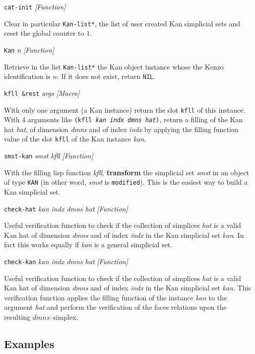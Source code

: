 {\parindent=0mm
{\leftskip=5mm
{\tt cat-init} \hfill {\em [Function]} \par}
{\leftskip=15mm
Clear in particular {\tt *Kan-list*}, the list of user created Kan simplicial sets  and reset
the global counter to $1$. \par}
{\leftskip=5mm 
{\tt Kan} {\em n} \hfill {\em [Function]}\par}
{\leftskip=15mm 
Retrieve in the list {\tt *Kan-list*} the Kan object instance whose the Kenzo identification  is $n$.
If it does not exist, return {\tt NIL}. \par}
{\leftskip=5mm 
{\tt kfll \&rest} {\em args} \hfill {\em [Macro]}\par}
{\leftskip=15mm 
With only one argument (a Kan instance) return the slot {\tt kfll} of this instance. With $4$ arguments
like {\tt (kfll {\em kan indx dmns hat})}, return a filling of the Kan hat {\em hat}, of dimension {\em dmns}
and of index {\em indx} by applying the filling function value of the slot {\tt kfll} of the Kan instance
{\em kan}. \par}
}
\newpage
{\parindent=0mm
{\leftskip=5mm 
{\tt smst-kan} {\em smst kfll} \hfill {\em [Function]}\par}
{\leftskip=15mm 
With the filling lisp function {\em kfll}, 
{\bf transform} the simplicial set {\em smst} in an object of type {\tt KAN} 
(in other word, {\em smst} is {\tt modified}).
This is the easiest way to build a Kan simplicial set. \par}
{\leftskip=5mm 
{\tt check-hat} {\em kan indx dmns hat} \hfill {\em [Function]}\par}
{\leftskip=15mm 
Useful verification function to check if the collection of simplices {\em hat} is a valid Kan hat
of dimension {\em dmns} and of index {\em indx} in the Kan simplicial set {\em kan}. In fact this
works equally if {\em kan} is a general simplicial set. \par}
{\leftskip=5mm 
{\tt check-kan} {\em kan indx dmns hat} \hfill {\em [Function]}\par}
{\leftskip=15mm 
Useful verification function to check if the collection of simplices {\em hat} is a valid Kan hat
of dimension {\em dmns} and of index {\em indx} in the Kan simplicial set {\em kan}. This verification
function applies the filling function of the instance {\em kan} to the argument {\em hat} and perform
the  verification of the faces relations upon the resulting $dmns$--simplex. \par}
}

\subsection* {Examples}

